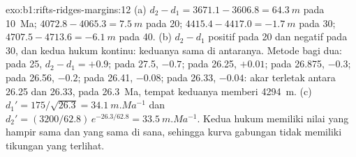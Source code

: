 \begin{solution}{exo:b1:rifts-ridges-margins:12}
(a) $d_2 - d_1 = 3671.1 - 3606.8 = \qty{64.3}{m}$ pada \qty{10}{Ma};
$4072.8 - 4065.3 = \qty{7.5}{m}$ pada 20; $4415.4 - 4417.0 = \qty{-1.7}{m}$ pada
30; $4707.5 - 4713.6 = \qty{-6.1}{m}$ pada 40. (b) $d_2 - d_1$ positif pada 20
dan negatif pada 30, dan kedua hukum kontinu: keduanya sama di antaranya.
Metode bagi dua: pada 25, $d_2 - d_1 = +0.9$; pada 27.5, $-0.7$; pada 26.25, $+0.01$; pada
26.875, $-0.3$; pada 26.56, $-0.2$; pada 26.41, $-0.08$; pada 26.33, $-0.04$: akar
terletak antara 26.25 dan 26.33, pada \qty{26.3}{Ma}, tempat keduanya memberi
\qty{4294}{m}. (c) $d_1' = 175/\sqrt{26.3} = \qty{34.1}{m.Ma^{-1}}$ dan
$d_2' = (3200/62.8)\,e^{-26.3/62.8} = \qty{33.5}{m.Ma^{-1}}$. Kedua hukum memiliki
nilai yang hampir sama dan  yang sama di sana, sehingga kurva gabungan tidak
memiliki tikungan yang terlihat.
\end{solution}

